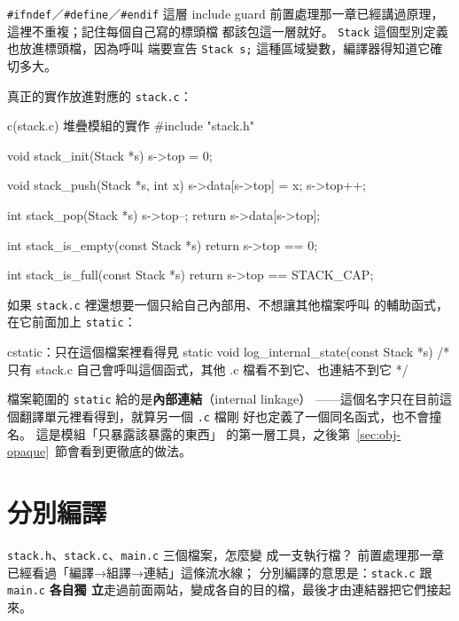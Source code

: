 \texttt{\#ifndef}／\texttt{\#define}／\texttt{\#endif} 這層 include
guard 前置處理那一章已經講過原理，這裡不重複；記住每個自己寫的標頭檔
都該包這一層就好。 \texttt{Stack} 這個型別定義也放進標頭檔，因為呼叫
端要宣告 \texttt{Stack s;} 這種區域變數，編譯器得知道它確切多大。

真正的實作放進對應的 \texttt{stack.c}：

\begin{example}{c}{(stack.c) 堆疊模組的實作}
#include "stack.h"

void stack_init(Stack *s) {
    s->top = 0;
}

void stack_push(Stack *s, int x) {
    s->data[s->top] = x;
    s->top++;
}

int stack_pop(Stack *s) {
    s->top--;
    return s->data[s->top];
}

int stack_is_empty(const Stack *s) {
    return s->top == 0;
}

int stack_is_full(const Stack *s) {
    return s->top == STACK_CAP;
}
\end{example}

如果 \texttt{stack.c} 裡還想要一個只給自己內部用、不想讓其他檔案呼叫
的輔助函式，在它前面加上 \texttt{static}：

\begin{code}{c}{static：只在這個檔案裡看得見}
static void log_internal_state(const Stack *s) {
    /* 只有 stack.c 自己會呼叫這個函式，其他 .c 檔看不到它、也連結不到它 */
}
\end{code}

檔案範圍的 \texttt{static} 給的是\textbf{內部連結}（internal linkage）
——這個名字只在目前這個翻譯單元裡看得到，就算另一個 \texttt{.c} 檔剛
好也定義了一個同名函式，也不會撞名。 這是模組「只暴露該暴露的東西」
的第一層工具，之後第~\ref{sec:obj-opaque}~節會看到更徹底的做法。


\section{分別編譯}
\label{sec:obj-compile}

\texttt{stack.h}、\texttt{stack.c}、\texttt{main.c} 三個檔案，怎麼變
成一支執行檔？ 前置處理那一章已經看過「編譯→組譯→連結」這條流水線；
分別編譯的意思是：\texttt{stack.c} 跟 \texttt{main.c} \textbf{各自獨
立}走過前面兩站，變成各自的目的檔，最後才由連結器把它們接起來。

